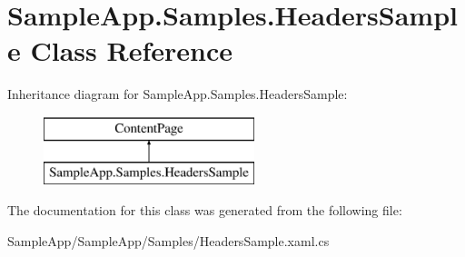 \hypertarget{class_sample_app_1_1_samples_1_1_headers_sample}{}\section{Sample\+App.\+Samples.\+Headers\+Sample Class Reference}
\label{class_sample_app_1_1_samples_1_1_headers_sample}
Inheritance diagram for Sample\+App.\+Samples.\+Headers\+Sample\+:\begin{figure}[H]
\begin{center}
\leavevmode
\includegraphics[height=2.000000cm]{class_sample_app_1_1_samples_1_1_headers_sample}
\end{center}
\end{figure}


The documentation for this class was generated from the following file\+:\begin{DoxyCompactItemize}
\item 
Sample\+App/\+Sample\+App/\+Samples/Headers\+Sample.\+xaml.\+cs\end{DoxyCompactItemize}
